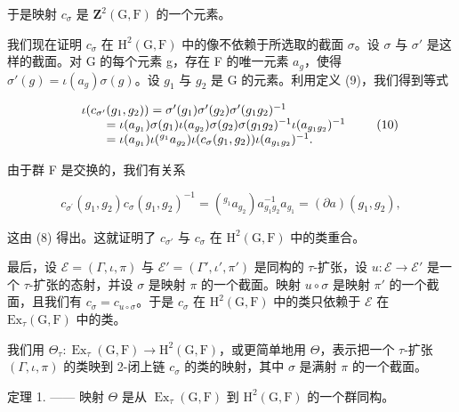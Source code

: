 于是映射 \(c_{\sigma}\) 是 \(\mathbf{Z}^2 (\mathrm{G},\mathrm{F})\) 的一个元素。

我们现在证明 \(c_{\sigma}\) 在 \(\mathrm{H}^{2}(\mathrm{G},\mathrm{F})\) 中的像不依赖于所选取的截面 \(\sigma\)。设 \(\sigma\) 与 \(\sigma'\) 是这样的截面。对 G 的每个元素 g，存在 F 的唯一元素 \(a_{g}\)，使得 \(\sigma'(g) = \iota(a_{g})\sigma(g)\)。设 \(g_{1}\) 与 \(g_{2}\) 是 G 的元素。利用定义 (9)，我们得到等式

\[
\begin{array}{r l} & {\iota (c _ {\sigma^ {\prime}} (g _ {1}, g _ {2})) = \sigma^ {\prime} (g _ {1}) \sigma^ {\prime} (g _ {2}) \sigma^ {\prime} (g _ {1} g _ {2}) ^ {- 1}} \\ & {\qquad = \iota (a _ {g _ {1}}) \sigma (g _ {1}) \iota (a _ {g _ {2}}) \sigma (g _ {2}) \sigma (g _ {1} g _ {2}) ^ {- 1} \iota (a _ {g _ {1} g _ {2}}) ^ {- 1}} \\ & {\qquad = \iota (a _ {g _ {1}}) \iota (^ {g _ {1}} a _ {g _ {2}}) \iota (c _ {\sigma} (g _ {1}, g _ {2})) \iota (a _ {g _ {1} g _ {2}}) ^ {- 1}.} \end{array}\tag{10}
\]

由于群 F 是交换的，我们有关系

\[
c _ {\sigma^ {\prime}} (g _ {1}, g _ {2}) c _ {\sigma} (g _ {1}, g _ {2}) ^ {- 1} = (^ {g _ {1}} a _ {g _ {2}}) a _ {g _ {1} g _ {2}} ^ {- 1} a _ {g _ {1}} = (\partial a) (g _ {1}, g _ {2}),\tag{11}
\]

这由 (8) 得出。这就证明了 \(c_{\sigma'}\) 与 \(c_{\sigma}\) 在 \(\mathrm{H}^2(\mathrm{G},\mathrm{F})\) 中的类重合。

最后，设 \(\mathcal{E} = (\Gamma, \iota, \pi)\) 与 \(\mathcal{E}' = (\Gamma', \iota', \pi')\) 是同构的 \(\tau\)-扩张，设 \(u: \mathcal{E} \to \mathcal{E}'\) 是一个 \(\tau\)-扩张的态射，并设 \(\sigma\) 是映射 \(\pi\) 的一个截面。映射 \(u \circ \sigma\) 是映射 \(\pi'\) 的一个截面，且我们有 \(c_{\sigma} = c_{u \circ \sigma}\)。于是 \(c_{\sigma}\) 在 \(\mathrm{H}^2(\mathrm{G}, \mathrm{F})\) 中的类只依赖于 \(\mathcal{E}\) 在 \(\mathrm{Ex}_{\tau}(\mathrm{G}, \mathrm{F})\) 中的类。

我们用 \(\Theta_{\tau}: \operatorname{Ex}_{\tau}(\mathrm{G},\mathrm{F}) \to \mathrm{H}^{2}(\mathrm{G},\mathrm{F})\)，或更简单地用 \(\Theta\)，表示把一个 \(\tau\)-扩张 \((\Gamma,\iota,\pi)\) 的类映到 2-闭上链 \(c_{\sigma}\) 的类的映射，其中 \(\sigma\) 是满射 \(\pi\) 的一个截面。

定理 1. —— 映射 \(\Theta\) 是从 \(\operatorname{Ex}_{\tau}(\mathrm{G},\mathrm{F})\) 到 \(\mathrm{H}^2 (\mathrm{G},\mathrm{F})\) 的一个群同构。

